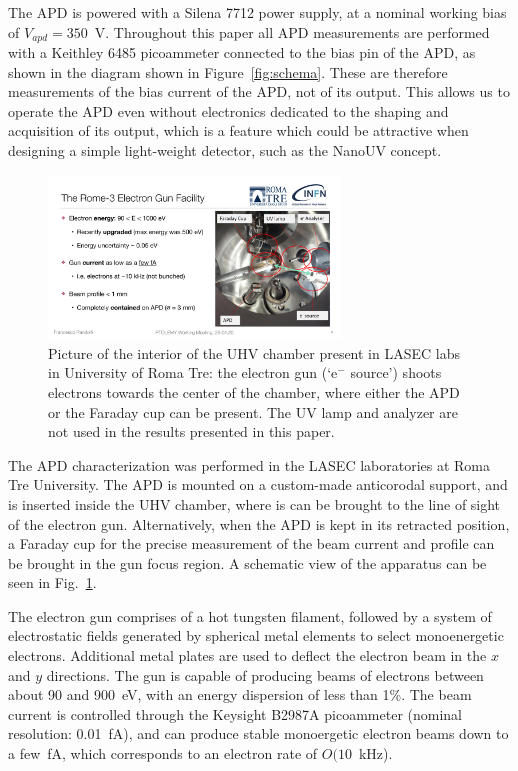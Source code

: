 \documentclass[12p]{paper}
\begin{document}
The APD is powered with a Silena 7712 power supply, at a nominal working bias of $V_{apd} = 350$~V. Throughout this paper all APD measurements are performed with a Keithley 6485 picoammeter connected to the bias pin of the APD, as shown in the diagram shown in Figure~\ref{fig:schema}. These are therefore measurements of the bias current of the APD, not of its output. This allows us to operate the APD even without electronics dedicated to the shaping and acquisition of its output, which is a feature which could be attractive when designing a simple light-weight detector, such as the NanoUV concept. 

\begin{figure}[tb]
  \centering
\includegraphics[width=0.69\textwidth]{figures/chamber_photo}
 \caption{Picture of the interior of the UHV chamber present in LASEC labs in University of Roma Tre: the electron gun (`e$^{-}$ source') shoots electrons towards the center of the chamber, where either the APD or the Faraday cup can be present. The UV lamp and analyzer are not used in the results presented in this paper.
  \label{fig:gun}}
\end{figure}


The APD characterization was performed in the LASEC laboratories at Roma Tre University. The APD is mounted on a custom-made anticorodal support, and is inserted inside the UHV chamber, where is can be brought to the line of sight of the electron gun. Alternatively, when the APD is kept in its retracted position, a Faraday cup for the precise measurement of the beam current and profile can be brought in the gun focus region. A schematic view of the apparatus can be seen in Fig.~\ref{fig:gun}.

The electron gun comprises of a hot tungsten filament, followed by a system of electrostatic fields generated by spherical metal elements to select monoenergetic electrons. Additional metal plates are used to deflect the electron beam in the $x$ and $y$ directions. The gun is capable of producing beams of electrons between about 90 and 900~eV, with an energy dispersion of less than 1\%. The beam current is controlled through the Keysight B2987A picoammeter (nominal resolution: 0.01~fA), and can produce stable monoergetic electron beams down to a few~fA, which corresponds to an electron rate of $O(10$~kHz).
\end{document}
